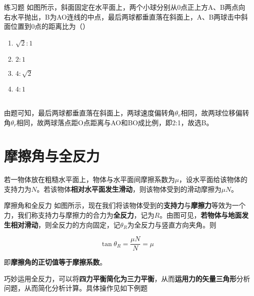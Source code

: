 \begin{ep}{练习题}{}
如图所示，斜面固定在水平面上，两个小球分别从0点正上方A、B两点向右水平抛出，B为AO连线的中点，最后两球都垂直落在斜面上，A、B两球击中斜面位置到0点的距离比为（）

\begin{minipage}[b]{0.6\linewidth}
\begin{enumerate}[label=(\Alph*)]
  \item $\sqrt{2}:1$
  \item $2:1$
  \item $4:\sqrt{2}$
  \item $4:1$
\end{enumerate}
\end{minipage}
\hfill
\begin{minipage}[b]{0.3\linewidth}

\end{minipage}
~\\

由题可知，最后两球都垂直落在斜面上，两球速度偏转角$\theta_v$相同，故两球位移偏转角$\theta_r$相同，故两球落点距O点距离与AO和BO成比例，即2:1，故选B。
\end{ep}

\section{摩擦角与全反力}

若一物体放在粗糙水平面上，物体与水平面间摩擦系数为$\mu$，设水平面给该物体的支持力为$N$。若该物体\textbf{相对水平面发生滑动}，则该物体受到的滑动摩擦为$\mu N$。



\begin{defi}{摩擦角和全反力}{}
如图所示，现在我们将该物体受到的\textbf{支持力}与\textbf{摩擦力}等效为一个力，我们称支持力与摩擦力的合力为\textbf{全反力}，记为$R$。由图可见，\textbf{若物体与地面发生相对滑动}，则全反力的方向固定，记$\theta_R$为全反力与竖直方向夹角。则

$$\tan{\theta_R}  = \frac{\mu N}{N} = \mu$$

即\textbf{摩擦角的正切值等于摩擦系数}。
\end{defi}

巧妙运用全反力，可以将\textbf{四力平衡简化为三力平衡}，从而\textbf{运用力的矢量三角形}分析问题，从而简化分析计算。具体操作见如下例题

